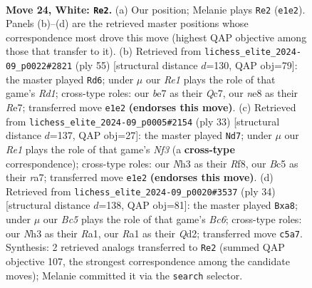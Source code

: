 \documentclass[11pt]{article}
\begin{document}
\clearpage

\begin{figure}[p]\centering
\begin{subfigure}{0.46\textwidth}\centering
\resizebox{\linewidth}{!}{%
\newchessgame
\chessboard[
  setfen={2bqnkr1/4bp2/p5p1/n1BBp2p/P3P3/3PQ2N/1rP2PPP/RN2R1K1 w - - 0 24},
  showmover=false,
  pgfstyle=straightmove, color=movearrow, markmove={e1-e2}
]}
\caption{}
\end{subfigure}\hfill
\begin{subfigure}{0.46\textwidth}\centering
\resizebox{\linewidth}{!}{%
\newchessgame
\chessboard[
  setfen={bk1r4/p1q1rpp1/1pB2b1p/N1ppnP2/Q7/R5B1/P1P3PP/2KR4 b - - 8 28},
  showmover=false,
  pgfstyle=straightmove, color=movearrow, markmove={d8-d6}
]}
\caption{}
\end{subfigure}
\\[4pt]
\begin{subfigure}{0.46\textwidth}\centering
\resizebox{\linewidth}{!}{%
\newchessgame
\chessboard[
  setfen={5rk1/Rrq1bppp/2p1bn2/1p2p3/4P3/4BP2/1PPQBNPP/R5K1 b - - 7 17},
  showmover=false,
  pgfstyle=straightmove, color=movearrow, markmove={f6-d7}
]}
\caption{}
\end{subfigure}\hfill
\begin{subfigure}{0.46\textwidth}\centering
\resizebox{\linewidth}{!}{%
\newchessgame
\chessboard[
  setfen={r2qkb1r/3b1p2/p1B3p1/4p1Pn/3p4/2N1B3/PPPQ1P2/R3K1R1 w Qkq - 2 18},
  showmover=false,
  pgfstyle=straightmove, color=movearrow, markmove={c6-a8}
]}
\caption{}
\end{subfigure}
\caption{\textbf{Move 24, White: \texttt{Re2}.} (a) Our position; Melanie plays \texttt{Re2} (\texttt{e1e2}). Panels (b)--(d) are the retrieved master positions whose correspondence most drove this move (highest QAP objective among those that transfer to it). (b) Retrieved from \texttt{lichess\_elite\_2024-09\_p0022\#2821} (ply 55) [structural distance $d$=130, QAP obj=79]: the master played \texttt{Rd6}; under $\mu$ our \emph{Re1} plays the role of that game's \emph{Rd1}; cross-type roles: our \emph{b}e7 as their \emph{Q}c7, our \emph{n}e8 as their \emph{R}e7; transferred move \texttt{e1e2} \textbf{(endorses this move)}. (c) Retrieved from \texttt{lichess\_elite\_2024-09\_p0005\#2154} (ply 33) [structural distance $d$=137, QAP obj=27]: the master played \texttt{Nd7}; under $\mu$ our \emph{Re1} plays the role of that game's \emph{Nf3} (a \textbf{cross-type} correspondence); cross-type roles: our \emph{N}h3 as their \emph{R}f8, our \emph{B}c5 as their \emph{r}a7; transferred move \texttt{e1e2} \textbf{(endorses this move)}. (d) Retrieved from \texttt{lichess\_elite\_2024-09\_p0020\#3537} (ply 34) [structural distance $d$=138, QAP obj=81]: the master played \texttt{Bxa8}; under $\mu$ our \emph{Bc5} plays the role of that game's \emph{Bc6}; cross-type roles: our \emph{N}h3 as their \emph{R}a1, our \emph{R}a1 as their \emph{Q}d2; transferred move \texttt{c5a7}. Synthesis: 2 retrieved analogs transferred to \texttt{Re2} (summed QAP objective 107, the strongest correspondence among the candidate moves); Melanie committed it via the \texttt{search} selector.}
\label{fig:thought-m46}
\end{figure}
\end{document}
